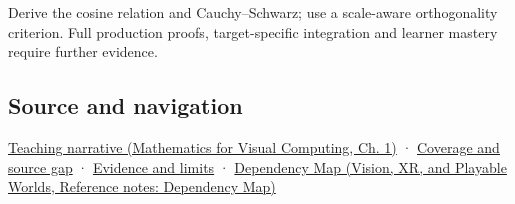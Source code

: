 Derive the cosine relation and Cauchy--Schwarz; use a scale-aware orthogonality criterion. Full production proofs, target-specific integration and learner mastery require further evidence.

\subsection{Source and navigation}\label{appendix-8bc4e8fc547c-source-and-navigation}

\href{../02-Mathematics-for-Visual-Computing/main.pdf\#nameddest=01-foundations-i-ch017-the-dot-product-turns-two-movements-into-a-measurement}{Teaching narrative (Mathematics for Visual Computing, Ch. 1)} · \hyperref[appendix-fd090d982a15-phase-6---parts-501-600]{Coverage and source gap} · \hyperref[appendix-a103e7846d21-phase-6---source-analysis-and-verification]{Evidence and limits} · \href{../07-Vision-XR-and-Playable-Worlds/main.pdf\#nameddest=appendix-4ad47bdd269a}{Dependency Map (Vision, XR, and Playable Worlds, Reference notes: Dependency Map)}
